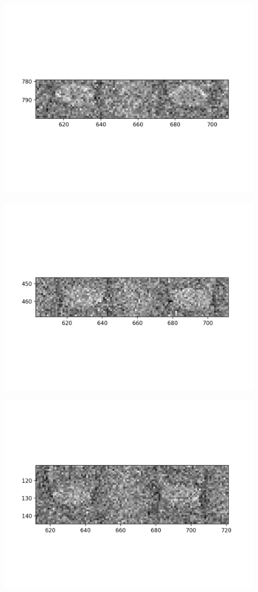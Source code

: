 \documentclass[10pt,a4paper]{article}
\begin{document}
\begin{figure}
	\includegraphics{data/image_stamps/b4}
\end{figure}
\begin{figure}
	\includegraphics{data/image_stamps/b5}
\end{figure}
\begin{figure}
	\includegraphics{data/image_stamps/b6}
\end{figure}
\end{document}
